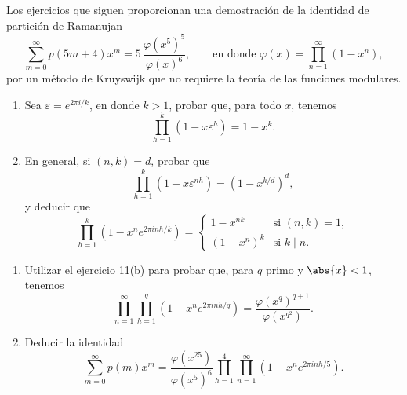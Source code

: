 \documentclass[12pt,a4paper]{book}
\begin{document}
    Los ejercicios que siguen proporcionan una demostración de la identidad de partición de
    Ramanujan
    \begin{equation*}
        \sum_{m=0}^{\infty}p(5m+4)x^{m}=5\,\frac{\varphi(x^{5})^{5}}{\varphi(x)^{6}},\qquad\text{en donde }\varphi(x)=\prod_{n=1}^{\infty}(1-x^{n}),
    \end{equation*}
    por un método de Kruyswijk que no requiere la teoría de las funciones modulares.

    \begin{ejercicio}
        \begin{enumerate}
            \item[(a)] Sea $\varepsilon=e^{2\pi i/k}$, en donde $k>1$, probar que, para todo
            $x$, tenemos
            \begin{equation*}
                \prod_{h=1}^{k}(1-x\varepsilon^{h})=1-x^{k}.
            \end{equation*}
            \item[(b)] En general, si $(n,k)=d$, probar que
            \begin{equation*}
                \prod_{h=1}^{k}(1-x\varepsilon^{nh})=(1-x^{k/d})^{d},
            \end{equation*}
            y deducir que
            \begin{equation*}
                \prod_{h=1}^{k}(1-x^{n}e^{2\pi inh/k})=
                \begin{cases}
                    1-x^{nk}&\text{si }(n,k)=1,\\
                    (1-x^{n})^{k}&\text{si }k\mid n.
                \end{cases}
            \end{equation*}
        \end{enumerate}
    \end{ejercicio}

    \begin{ejercicio}
        \begin{enumerate}
            \item[(a)] Utilizar el ejercicio 11(b) para probar que, para $q$ primo y
            $\abs{x}<1$, tenemos
            \begin{equation*}
                \prod_{n=1}^{\infty}\prod_{h=1}^{q}(1-x^{n}e^{2\pi inh/q})=\frac{\varphi(x^{q})^{q+1}}{\varphi(x^{q^{2}})}.
            \end{equation*}
            \item[(b)] Deducir la identidad
            \begin{equation*}
                \sum_{m=0}^{\infty}p(m)x^{m}=\frac{\varphi(x^{25})}{\varphi(x^{5})^{6}}\prod_{h=1}^{4}\prod_{n=1}^{\infty}(1-x^{n}e^{2\pi inh/5}).
            \end{equation*}
        \end{enumerate}
    \end{ejercicio}
\end{document}
